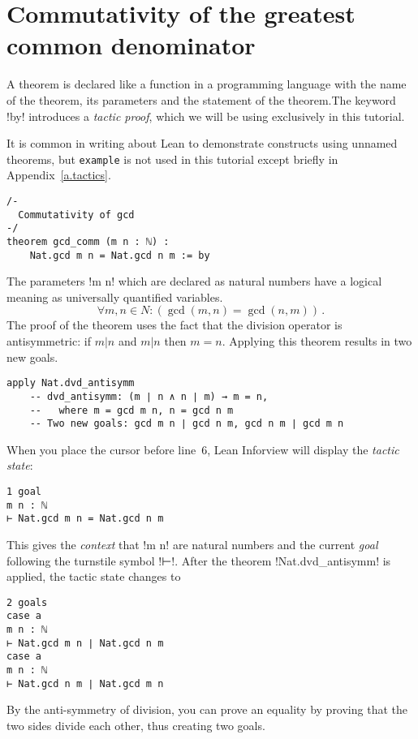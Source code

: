 
\section{Commutativity of the greatest common denominator}


A theorem is declared like a function in a programming language with the name of the theorem, its parameters and the statement of the theorem.The keyword !by! introduces a \emph{tactic proof}, which we will be using exclusively in this tutorial.

It is common in writing about Lean to demonstrate constructs using unnamed  theorems, but \Verb+example+ is not used in this tutorial except briefly in  Appendix~\ref{a.tactics}.

\begin{Verbatim}
/-
  Commutativity of gcd
-/
theorem gcd_comm (m n : ℕ) :
    Nat.gcd m n = Nat.gcd n m := by
\end{Verbatim}

The parameters !m n! which are declared as natural numbers have a logical meaning as universally quantified variables.
\[
\forall m, n \in N : (\gcd (m,n) = \gcd (n,m))\,.
\]
The proof of the theorem uses the fact that the division operator is antisymmetric: if $m | n$ and $m | n$ then $m=n$. Applying this theorem results in two new goals.
\begin{Verbatim}[firstnumber=last]
  apply Nat.dvd_antisymm
    -- dvd_antisymm: (m ∣ n ∧ n ∣ m) → m = n,
    --   where m = gcd m n, n = gcd n m
    -- Two new goals: gcd m n ∣ gcd n m, gcd n m ∣ gcd m n
\end{Verbatim}

When you place the cursor before line~6, Lean Inforview will display the \emph{tactic state}:
\begin{Verbatim}[numbers=none]
1 goal
m n : ℕ
⊢ Nat.gcd m n = Nat.gcd n m
\end{Verbatim}
This gives the \emph{context} that !m n! are natural numbers and the current \emph{goal} following the turnstile symbol !⊢!. After the theorem !Nat.dvd_antisymm! is applied, the tactic state changes to
\begin{Verbatim}[numbers=none]
2 goals
case a
m n : ℕ
⊢ Nat.gcd m n ∣ Nat.gcd n m
case a
m n : ℕ
⊢ Nat.gcd n m ∣ Nat.gcd m n
\end{Verbatim}
By the anti-symmetry of division, you can prove an equality by proving that the two sides divide each other, thus creating two goals.

